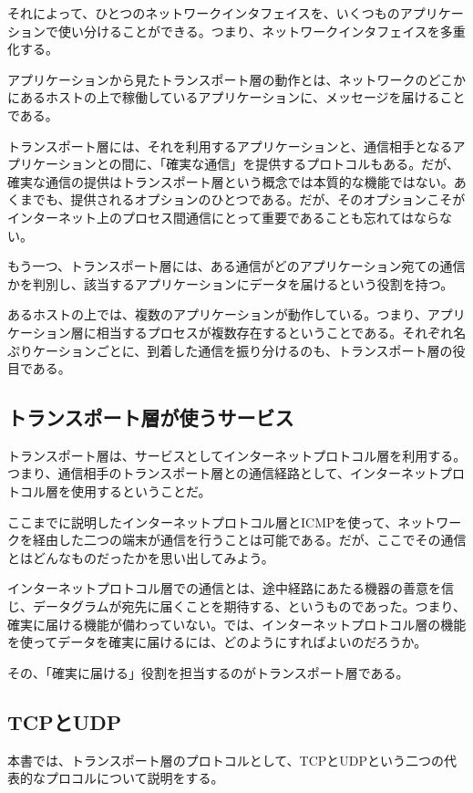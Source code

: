 それによって、ひとつのネットワークインタフェイスを、いくつものアプリケーションで使い分けることができる。つまり、ネットワークインタフェイスを多重化する。

アプリケーションから見たトランスポート層の動作とは、ネットワークのどこかにあるホストの上で稼働しているアプリケーションに、メッセージを届けることである。

トランスポート層には、それを利用するアプリケーションと、通信相手となるアプリケーションとの間に、「確実な通信」を提供するプロトコルもある。だが、確実な通信の提供はトランスポート層という概念では本質的な機能ではない。あくまでも、提供されるオプションのひとつである。だが、そのオプションこそがインターネット上のプロセス間通信にとって重要であることも忘れてはならない。

もう一つ、トランスポート層には、ある通信がどのアプリケーション宛ての通信かを判別し、該当するアプリケーションにデータを届けるという役割を持つ。

あるホストの上では、複数のアプリケーションが動作している。つまり、アプリケーション層に相当するプロセスが複数存在するということである。それぞれ名ぷりケーションごとに、到着した通信を振り分けるのも、トランスポート層の役目である。


\subsection{トランスポート層が使うサービス}

トランスポート層は、サービスとしてインターネットプロトコル層を利用する。つまり、通信相手のトランスポート層との通信経路として、インターネットプロトコル層を使用するということだ。

ここまでに説明したインターネットプロトコル層とICMPを使って、ネットワークを経由した二つの端末が通信を行うことは可能である。だが、ここでその通信とはどんなものだったかを思い出してみよう。

インターネットプロトコル層での通信とは、途中経路にあたる機器の善意を信じ、データグラムが宛先に届くことを期待する、というものであった。つまり、確実に届ける機能が備わっていない。では、インターネットプロトコル層の機能を使ってデータを確実に届けるには、どのようにすればよいのだろうか。

その、「確実に届ける」役割を担当するのがトランスポート層である。

\subsection{TCPとUDP}
本書では、トランスポート層のプロトコルとして、TCPとUDPという二つの代表的なプロコルについて説明をする。

